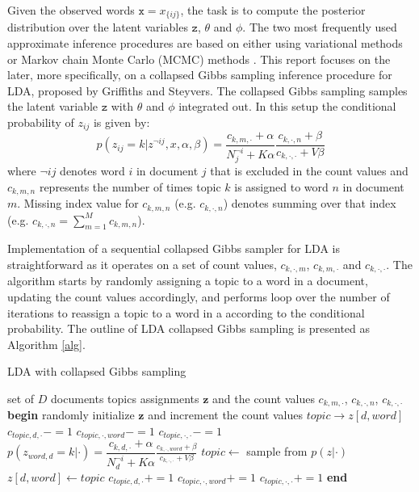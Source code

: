 \documentclass[journal]{IEEEtran}
\begin{document}
Given the observed words $\texttt{x}=x_{\{ij\}}$, the task is to compute the posterior distribution over the latent variables $\texttt{z}$, $\theta$ and $\phi$. The two most frequently used approximate inference procedures are based on either using variational methods\cite{blei2003latent} or Markov chain Monte Carlo (MCMC) methods \cite{griffiths2004finding}. This report focuses on the later, more specifically, on a collapsed Gibbs sampling inference procedure for LDA, proposed by Griffiths and Steyvers\cite{griffiths2004finding}. The collapsed Gibbs sampling samples the latent variable $\texttt{z}$ with $\theta$ and $\phi$ integrated out. In this setup the conditional probability of $z_{ij}$ is given by:
$$
p(z_{ij}=k|z^{\lnot ij}, x, \alpha, \beta) = \dfrac{c_{k,m,\cdot} + \alpha}{N_{j}^{\lnot i}+K\alpha} \frac{c_{k,\cdot,n} + \beta}{c_{k,\cdot,\cdot} + V\beta}
$$ 
where $\lnot ij$ denotes word $i$ in document $j$ that is excluded in the count values and $c_{k,m,n}$ represents the number of times topic $k$ is assigned to word $n$ in document $m$. Missing index value for $c_{k,m,n}$ (e.g. $c_{k,\cdot,n}$) denotes summing over that index (e.g. $c_{k,\cdot,n} = \sum_{m=1}^{M} c_{k,m,n}$).

Implementation of a sequential collapsed Gibbs sampler for LDA is straightforward as it operates on a set of count values, $c_{k,\cdot,m}$, $c_{k,m,\cdot}$ and $c_{k,\cdot,\cdot}$. The algorithm starts by randomly assigning a topic to a word in a document, updating the count values accordingly, and performs loop over the number of iterations to reassign a topic to a word in a according to the conditional probability. The outline of LDA collapsed Gibbs sampling is presented as Algorithm \ref{alg}.
 \begin{algorithm}
\caption{LDA with collapsed Gibbs sampling}
\label{alg}
\begin{algorithmic}
\scriptsize
\Require set of $D$ documents
\Ensure topics assignments $\textbf{z}$ and the count values $c_{k,m,\cdot}$, $c_{k,\cdot,n}$, $c_{k,\cdot,\cdot}$
\State \textbf{begin}
\State randomly initialize $\textbf{z}$ and increment the count values
            \State $ topic \rightarrow z[d, word]$
            \State $c_{topic,d,\cdot} -= 1$
            \State $c_{topic,\cdot,word}-=1$
            \State $c_{topic,\cdot,\cdot}-=1$
            	\State $p(z_{word,d}=k|\cdot) = \dfrac{c_{k,d,\cdot} + \alpha}{N_{d}^{\lnot i}+K\alpha} \frac{c_{k,\cdot,word} + \beta}{c_{k,\cdot,\cdot} + V\beta}$
            \EndFor
            \State $topic \leftarrow$ sample from $p(z|\cdot)$
            \State $z[d, word] \leftarrow topic $
            \State $c_{topic,d,\cdot} += 1$
            \State $c_{topic,\cdot,word} +=1$
            \State $c_{topic,\cdot,\cdot}+=1$
		 \EndFor            
      \EndFor 
   \EndFor
\State \textbf{end}
        \end{algorithmic}
    \end{algorithm}
\end{document}

